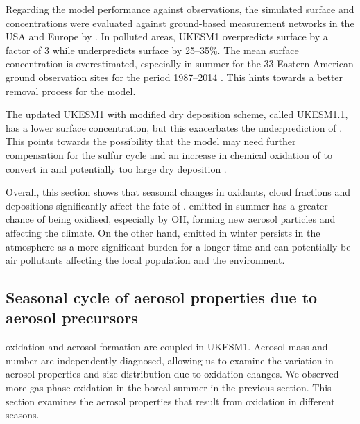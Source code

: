 Regarding the model performance against observations, the simulated surface  and  concentrations were evaluated against ground-based measurement networks in the USA and Europe by \citet{hardacreEvaluationSO2SO422021}. In polluted areas, UKESM1 overpredicts surface  by a factor of 3 while underpredicts surface  by 25--35\%. The mean surface  concentration is overestimated, especially in summer for the 33 Eastern American ground observation sites for the period 1987--2014 \citep{hardacreEvaluationSO2SO422021}. This hints towards a better removal process for the model. 


The updated UKESM1 with modified  dry deposition scheme, called UKESM1.1, has a lower surface  concentration, but this exacerbates the underprediction of  \citep{mulcahyUKESM1DevelopmentEvaluation2022}. This points towards the possibility that the model may need further compensation for the sulfur cycle and an increase in chemical oxidation of  to convert  in  and potentially too large dry deposition \citep{mulcahyUKESM1DevelopmentEvaluation2022}.

Overall, this section shows that seasonal changes in oxidants, cloud fractions and depositions significantly affect the fate of .  emitted in summer has a greater chance of being oxidised, especially by OH, forming new  aerosol particles and affecting the climate. On the other hand,  emitted in winter persists in the atmosphere as a more significant burden for a longer time and can potentially be air pollutants affecting the local population and the environment. 


\subsection{Seasonal cycle of aerosol properties due to aerosol precursors}

 oxidation and  aerosol formation are coupled in UKESM1. Aerosol mass and number are independently diagnosed, allowing us to examine the variation in aerosol properties and size distribution due to oxidation changes. We observed more gas-phase oxidation in the boreal summer in the previous section. This section examines the aerosol properties that result from oxidation in different seasons.


